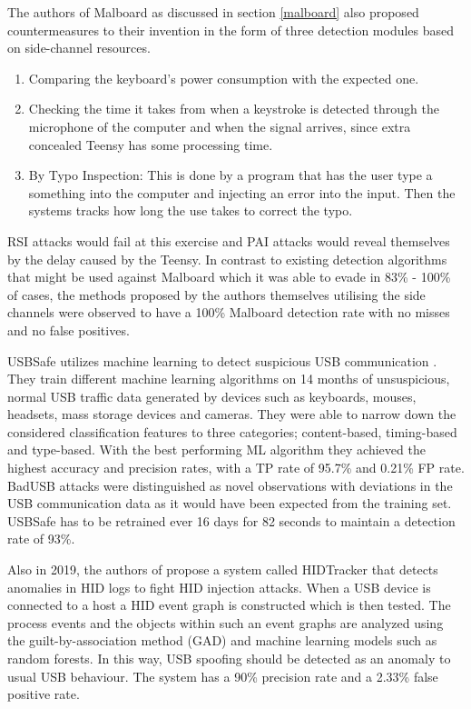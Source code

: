 The authors of Malboard \cite{farhiMalboardNovelUser2019} as discussed in section \ref{malboard} also proposed countermeasures to their invention in the form of three detection modules based on side-channel resources. 
\begin{enumerate}
    \item Comparing the keyboard's power consumption with the expected one.
    \item Checking the time it takes from when a keystroke is detected through the microphone of the computer and when the signal arrives, since extra  concealed Teensy has some processing time.
    \item By Typo Inspection: This is done by a program that has the user type a something into the computer and injecting an error into the input. Then the systems tracks how long the use takes to correct the typo.
\end{enumerate}
RSI attacks would fail at this exercise and PAI attacks would reveal themselves by the delay caused by the Teensy.   
In contrast to existing detection algorithms that might be used against Malboard which it was able to evade in 83\% - 100\% of cases, the methods proposed by the authors themselves utilising the side channels were observed to have a 100\% Malboard detection rate with no misses and no false positives.  

USBSafe utilizes machine learning to detect suspicious USB communication \cite{kharrazUSBESAFEEndPointSolution2019}. They train different machine learning algorithms on 14 months of unsuspicious, normal USB traffic data generated by devices such as keyboards, mouses, headsets, mass storage devices and cameras. They were able to narrow down the considered classification features to three categories; content-based, timing-based and type-based. With the best performing ML algorithm they achieved the highest accuracy and precision rates, with a TP rate of 95.7\% and 0.21\% FP rate. BadUSB attacks were distinguished as novel observations with deviations in the USB communication data as it would have been expected from the training set. 
USBSafe has to be retrained ever 16 days for 82 seconds to maintain a detection rate of 93\%.

Also in 2019, the authors of \cite{IdentifyingHIDbasedAttacks2019} propose a system called HIDTracker that detects anomalies in HID logs to fight HID injection attacks. When a USB device is connected to a host a HID event graph is constructed which is then tested. The process events and the objects within such an event graphs are analyzed using the guilt-by-association method (GAD) and machine learning models such as random forests. In this way, USB spoofing should be detected as an anomaly to usual USB behaviour. The system has a 90\% precision rate and a 2.33\% false positive rate. 

